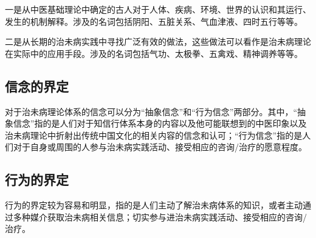 一是从中医基础理论中确定的古人对于人体、疾病、环境、世界的认识和其运行、发生的机制解释。涉及的名词包括阴阳、五脏关系、气血津液、四时五行等等。

二是从长期的治未病实践中寻找广泛有效的做法，这些做法可以看作是治未病理论在实际中的应用手段。涉及的名词包括气功、太极拳、五禽戏、精神调养等等。

\subsection{信念的界定}
对于治未病理论体系的信念可以分为“抽象信念”和“行为信念”两部分。其中，“抽象信念”指的是人们对于知信行体系本身的内容以及他可能联想到的中医印象以及治未病理论中折射出传统中国文化的相关内容的信念和认可；“行为信念”指的是人们对于自身或周围的人参与治未病实践活动、接受相应的咨询/治疗的愿意程度。
\subsection{行为的界定}
行为的界定较为容易和明显，指的是人们主动了解治未病体系的知识，或者主动通过多种媒介获取治未病相关信息；切实参与进治未病实践活动、接受相应的咨询/治疗。



